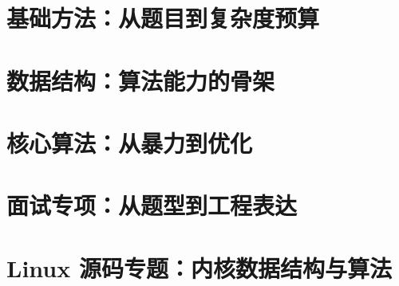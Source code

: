 \documentclass[UTF8,openany,zihao=5,fontset=none]{ctexbook}
\begin{document}
\frontmatter




\tableofcontents

\mainmatter

\part{基础方法：从题目到复杂度预算}


\part{数据结构：算法能力的骨架}



\part{核心算法：从暴力到优化}







\part{面试专项：从题型到工程表达}







\part{Linux 源码专题：内核数据结构与算法}


\appendix




\backmatter

\printindex
\end{document}
